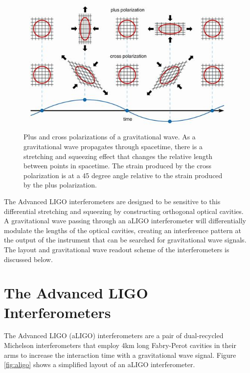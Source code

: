 \begin{figure}[ht!]
\includegraphics[width=\textwidth]{figures/introduction/polarisations2}
\caption[Plus and cross polarizations]{Plus and cross polarizations %
         of a gravitational wave. As a gravitational wave propagates through spacetime, %
         there is a stretching and squeezing effect that changes the relative length between %
         points in spacetime. The strain produced by the cross polarization %
         is at a 45 degree angle relative to the strain produced by the plus %
         polarization. }
\label{fig:polarizations}
\end{figure}

The Advanced LIGO interferometers are designed to be sensitive 
to this differential stretching and squeezing by constructing orthogonal 
optical cavities. A gravitational wave passing through an aLIGO interferometer 
will differentially 
modulate the lengths of the optical cavities, creating an interference 
pattern at the output of the instrument that can be searched for 
gravitational wave signals. The layout and gravitational wave readout scheme 
of the interferometers is discussed below.

\section{The Advanced LIGO Interferometers}\label{sec:aligo}

The Advanced LIGO (aLIGO) interferometers are a pair of dual-recycled Michelson interferometers 
that employ 4km long Fabry-Perot cavities in their arms to increase the interaction time with a 
gravitational wave signal. 
Figure \ref{fig:aligo} shows a simplified layout of an aLIGO interferometer. 

